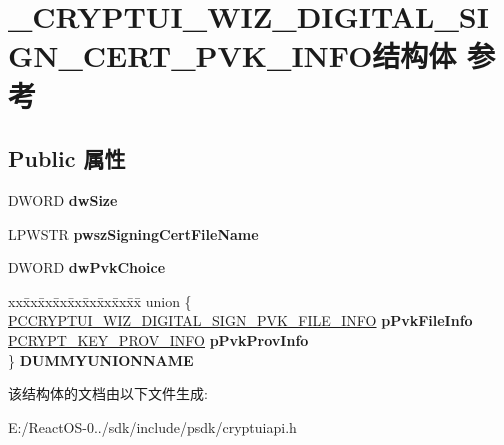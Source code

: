 \hypertarget{struct___c_r_y_p_t_u_i___w_i_z___d_i_g_i_t_a_l___s_i_g_n___c_e_r_t___p_v_k___i_n_f_o}{}\section{\+\_\+\+C\+R\+Y\+P\+T\+U\+I\+\_\+\+W\+I\+Z\+\_\+\+D\+I\+G\+I\+T\+A\+L\+\_\+\+S\+I\+G\+N\+\_\+\+C\+E\+R\+T\+\_\+\+P\+V\+K\+\_\+\+I\+N\+F\+O结构体 参考}
\label{struct___c_r_y_p_t_u_i___w_i_z___d_i_g_i_t_a_l___s_i_g_n___c_e_r_t___p_v_k___i_n_f_o}
\subsection*{Public 属性}
\begin{DoxyCompactItemize}
\item 
\mbox{\label{struct___c_r_y_p_t_u_i___w_i_z___d_i_g_i_t_a_l___s_i_g_n___c_e_r_t___p_v_k___i_n_f_o_ace716b42fe79ed49d9de094000bf8fe2}} 
D\+W\+O\+RD {\bfseries dw\+Size}
\item 
\mbox{\label{struct___c_r_y_p_t_u_i___w_i_z___d_i_g_i_t_a_l___s_i_g_n___c_e_r_t___p_v_k___i_n_f_o_a7146047a7466b1d36e84d2c6c3759bbb}} 
L\+P\+W\+S\+TR {\bfseries pwsz\+Signing\+Cert\+File\+Name}
\item 
\mbox{\label{struct___c_r_y_p_t_u_i___w_i_z___d_i_g_i_t_a_l___s_i_g_n___c_e_r_t___p_v_k___i_n_f_o_aa54d9169fe70efd2b0261e6f10e7b139}} 
D\+W\+O\+RD {\bfseries dw\+Pvk\+Choice}
\item 
\mbox{\label{struct___c_r_y_p_t_u_i___w_i_z___d_i_g_i_t_a_l___s_i_g_n___c_e_r_t___p_v_k___i_n_f_o_a365887fe8e40709502a90e4534cb7c2c}} 
\begin{tabbing}
xx\=xx\=xx\=xx\=xx\=xx\=xx\=xx\=xx\=\kill
union \{\\
\>\hyperlink{struct___c_r_y_p_t_u_i___w_i_z___d_i_g_i_t_a_l___s_i_g_n___p_v_k___f_i_l_e___i_n_f_o}{PCCRYPTUI\_WIZ\_DIGITAL\_SIGN\_PVK\_FILE\_INFO} {\bfseries pPvkFileInfo}\\
\>\hyperlink{struct___c_r_y_p_t___k_e_y___p_r_o_v___i_n_f_o}{PCRYPT\_KEY\_PROV\_INFO} {\bfseries pPvkProvInfo}\\
\} {\bfseries DUMMYUNIONNAME}\\

\end{tabbing}\end{DoxyCompactItemize}


该结构体的文档由以下文件生成\+:\begin{DoxyCompactItemize}
\item 
E\+:/\+React\+O\+S-\/0../sdk/include/psdk/cryptuiapi.\+h\end{DoxyCompactItemize}
